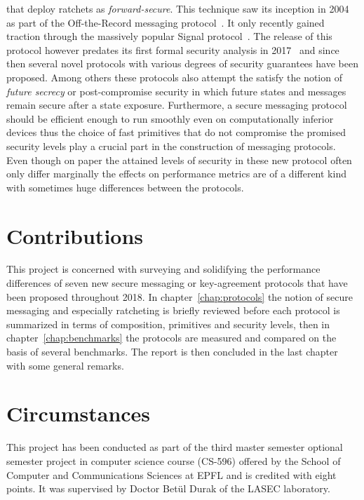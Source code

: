 \documentclass[11pt,a4paper,twoside,openright,bibliography=totoc]{scrbook}
\begin{document}
that deploy ratchets as \textit{forward-secure}. This technique saw
its inception in 2004 as part of the Off-the-Record messaging
protocol~\cite{borisov2004off}. It only recently gained traction
through the massively popular Signal protocol~\cite{perrin2016double}.
The release of this protocol however predates its first formal
security analysis in 2017~\cite{cohn2017formal}
and since then several novel protocols with various degrees of
security guarantees have been proposed. Among others
these protocols also attempt the satisfy the notion of
\textit{future secrecy} or post-compromise security in which future states and
messages remain secure after a state exposure. Furthermore, a secure messaging
protocol should be efficient enough to run smoothly even on
computationally inferior devices thus the choice of fast primitives
that do not compromise the promised security levels play a crucial
part in the construction of messaging protocols. Even though on paper
the attained levels of security in these new protocol often only
differ marginally the effects on performance metrics are of a
different kind with sometimes huge differences between the protocols.


\section{Contributions}
\label{sec:contributions}

This project is concerned with surveying and solidifying the
performance differences of seven new secure messaging or key-agreement
protocols that have been proposed throughout 2018. In
chapter~\ref{chap:protocols} the notion of secure messaging and
especially ratcheting is briefly reviewed before each protocol is
summarized in terms of composition, primitives and security levels, then in
chapter~\ref{chap:benchmarks} the protocols are measured and compared
on the basis of several benchmarks. The report is then concluded
in the last chapter with some general remarks.

\section{Circumstances}
\label{sec:circumstances}

This project has been conducted as part of the third master semester optional
semester project in computer science course (CS-596) offered by the
School of Computer and Communications Sciences at EPFL and is credited
with eight points. It was supervised by Doctor Betül Durak of
the LASEC laboratory.
\end{document}
